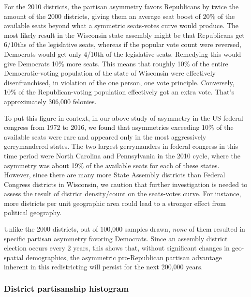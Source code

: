 \documentclass[preprint,12pt]{article}
\begin{document}
For the 2010 districts, the partisan asymmetry favors Republicans by twice the amount of the 2000 districts, giving them an average seat boost of 20\% of the available seats beyond what a symmetric seats-votes curve would produce.  
The most likely result in the Wisconsin state assembly might be that Republicans get 6/10ths of the legislative seats, whereas if the popular vote count were reversed, Democrats would get only 4/10th of the legislative seats.  
Remedying this would give Democrats 10\% more seats.  
This means that roughly 10\% of the entire Democratic-voting population of the state of Wisconsin were effectively disenfranchised, in violation of the one person, one vote principle.  
Conversely, 10\% of the Republican-voting population effectively got an extra vote.  That's approximately 306,000 felonies.

To put this figure in context, in our above study of asymmetry in the US federal congress from 1972 to 2016, we found that asymmetries exceeding 10\% of the available seats were rare and appeared only in the most aggressively gerrymandered states.
The two largest gerrymanders in federal congress in this time period were North Carolina and Pennsylvania in the 2010 cycle, where the asymmetry was about 19\% of the available seats for each of these states.
However, since there are many more State Assembly districts than Federal Congress districts in Wisconsin, we caution that further investigation is needed to assess the result of district density/count on the seats-votes curve.
For instance,  more districts per unit geographic area could lead to a stronger effect from political geography.

Unlike the 2000 districts, out of 100,000 samples drawn, \emph{none} of them resulted in specific partisan asymmetry favoring Democrats.  
Since an assembly district election occurs every 2 years, this shows that, without significant changes in geo-spatial demographics, the asymmetric pro-Republican partisan advantage inherent in this redistricting will persist for the next 200,000 years.

\subsubsection{District partisanship histogram}
  
\end{document}
